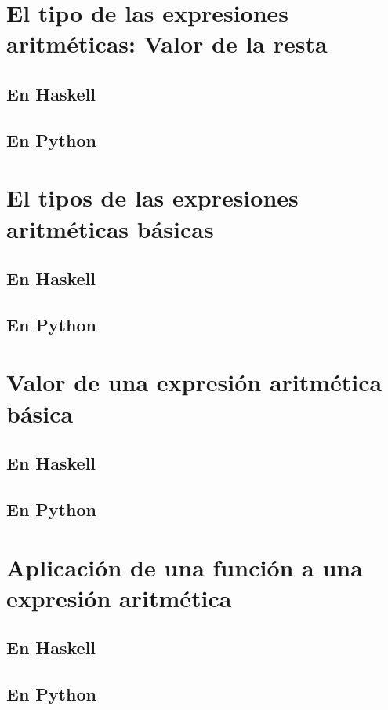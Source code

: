 \documentclass[a4paper,12pt,twoside]{book}
\begin{document}
\section{El tipo de las expresiones aritméticas: Valor de la resta}
\subsection*{En Haskell}
\subsection*{En Python}

\section{El tipos de las expresiones aritméticas básicas}
\subsection{En Haskell}
\subsection{En Python}

\section{Valor de una expresión aritmética básica}
\subsection{En Haskell}
\subsection{En Python}

\section{Aplicación de una función a una expresión aritmética}
\subsection{En Haskell}
\subsection{En Python}
\end{document}
